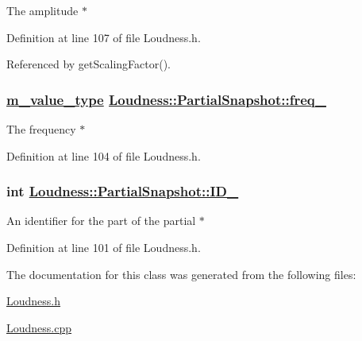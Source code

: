 The amplitude $\ast$ 

Definition at line 107 of file Loudness.h.

Referenced by get\-Scaling\-Factor().\hypertarget{classLoudness_1_1PartialSnapshot_o1}{
\subsubsection[freq\_\-]{\setlength{\rightskip}{0pt plus 5cm}\hyperlink{Types_8h_a3}{m\_\-value\_\-type} \hyperlink{classLoudness_1_1PartialSnapshot_o1}{Loudness::Partial\-Snapshot::freq\_\-}}}
\label{classLoudness_1_1PartialSnapshot_o1}


The frequency $\ast$ 

Definition at line 104 of file Loudness.h.\hypertarget{classLoudness_1_1PartialSnapshot_o0}{
\subsubsection[ID\_\-]{\setlength{\rightskip}{0pt plus 5cm}int \hyperlink{classLoudness_1_1PartialSnapshot_o0}{Loudness::Partial\-Snapshot::ID\_\-}}}
\label{classLoudness_1_1PartialSnapshot_o0}


An identifier for the part of the partial $\ast$ 

Definition at line 101 of file Loudness.h.

The documentation for this class was generated from the following files:\begin{CompactItemize}
\item 
\hyperlink{Loudness_8h}{Loudness.h}\item 
\hyperlink{Loudness_8cpp}{Loudness.cpp}\end{CompactItemize}
